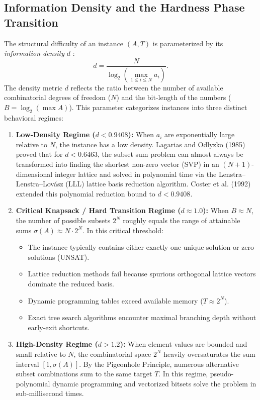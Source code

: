 \documentclass[journal,onecolumn,11pt]{IEEEtran}
\begin{document}
\subsection{Information Density and the Hardness Phase Transition}
The structural difficulty of an instance $(A, T)$ is parameterized by its \textit{information density} $d$ \cite{lagarias1985solving, coster1992improved}:
\begin{equation}
    d = \frac{N}{\log_2(\max_{1 \le i \le N} a_i)}.
    \label{eq:density_formula}
\end{equation}
The density metric $d$ reflects the ratio between the number of available combinatorial degrees of freedom ($N$) and the bit-length of the numbers ($B = \log_2(\max A)$). This parameter categorizes instances into three distinct behavioral regimes:

\begin{enumerate}
    \item \textbf{Low-Density Regime ($d < 0.9408$):} When $a_i$ are exponentially large relative to $N$, the instance has a low density. Lagarias and Odlyzko (1985) \cite{lagarias1985solving} proved that for $d < 0.6463$, the subset sum problem can almost always be transformed into finding the shortest non-zero vector (SVP) in an $(N+1)$-dimensional integer lattice and solved in polynomial time via the Lenstra--Lenstra--Lov\'asz (LLL) lattice basis reduction algorithm. Coster et al. (1992) \cite{coster1992improved} extended this polynomial reduction bound to $d < 0.9408$.
    
    \item \textbf{Critical Knapsack / Hard Transition Regime ($d \approx 1.0$):} When $B \approx N$, the number of possible subsets $2^N$ roughly equals the range of attainable sums $\sigma(A) \approx N \cdot 2^N$. In this critical threshold:
    \begin{itemize}
        \item The instance typically contains either exactly one unique solution or zero solutions (UNSAT).
        \item Lattice reduction methods fail because spurious orthogonal lattice vectors dominate the reduced basis.
        \item Dynamic programming tables exceed available memory ($T \approx 2^N$).
        \item Exact tree search algorithms encounter maximal branching depth without early-exit shortcuts.
    \end{itemize}
    
    \item \textbf{High-Density Regime ($d > 1.2$):} When element values are bounded and small relative to $N$, the combinatorial space $2^N$ heavily oversaturates the sum interval $[1, \sigma(A)]$. By the Pigeonhole Principle, numerous alternative subset combinations sum to the same target $T$. In this regime, pseudo-polynomial dynamic programming and vectorized bitsets solve the problem in sub-millisecond times.
\end{enumerate}
\end{document}
